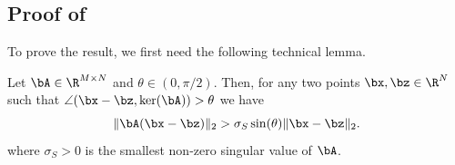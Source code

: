 \documentclass[11pt]{amsart}
\newcommand{\es}[1]{{\color{blue}#1}}
\begin{document}
\subsection{Proof of~}\label{app:rrsc} 
To prove the result, we first need the following technical lemma.
\begin{lemma}\label{lem:anglecond}
    Let $\bA\in\R^{M\times N}$ and $\theta\in(0,\pi/2)$. Then, for any two points  $\bx, \bz\in\R^N$ such that $\angle (\bx-\bz,\ker(\bA))> \theta$ we have 
    \begin{equation}
        \|\bA(\bx-\bz)\|_2> \sigma_S\sin(\theta) \|\bx-\bz\|_2.
    \end{equation}
where $\sigma_S>0$ is the smallest non-zero singular value of $\bA$.
\end{lemma}
\end{document}
